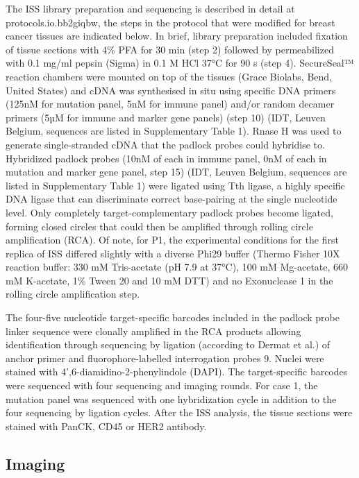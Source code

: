 The ISS library preparation and sequencing is described in detail at protocols.io.bb2giqbw, the steps in the protocol that were modified for breast cancer tissues are indicated below. In brief, library preparation included fixation of tissue sections with 4\% PFA for 30 min (step 2) followed by permeabilized with 0.1 mg/ml pepsin (Sigma) in 0.1 M HCl 37°C for 90 s (step 4). SecureSeal™ reaction chambers were mounted on top of the tissues (Grace Biolabs, Bend, United States) and cDNA was synthesised in situ using specific DNA primers (125nM for mutation panel, 5nM for immune panel) and/or random decamer primers (5µM for immune and marker gene panels) (step 10) (IDT, Leuven Belgium, sequences are listed in Supplementary Table 1). Rnase H was used to generate single-stranded cDNA that the padlock probes could hybridise to. Hybridized padlock probes (10nM of each in immune panel, 0nM of each in mutation and marker gene panel, step 15) (IDT, Leuven Belgium, sequences are listed in Supplementary Table 1) were ligated using Tth ligase, a highly specific DNA ligase that can discriminate correct base-pairing at the single nucleotide level. Only completely target-complementary padlock probes become ligated, forming closed circles that could then be amplified through rolling circle amplification (RCA). Of note, for P1, the experimental conditions for the first replica of ISS differed slightly with a diverse Phi29 buffer (Thermo Fisher 10X reaction buffer: 330 mM Tris-acetate (pH 7.9 at 37°C), 100 mM Mg-acetate, 660 mM K-acetate, 1\% Tween 20 and 10 mM DTT) and no Exonuclease 1 in the rolling circle amplification step.

The four-five nucleotide target-specific barcodes included in the padlock probe linker sequence were clonally amplified in the RCA products allowing identification through sequencing by ligation (according to Dermat et al.) of anchor primer and fluorophore-labelled interrogation probes 9. Nuclei were stained with 4',6-diamidino-2-phenylindole (DAPI). The target-specific barcodes were sequenced with four sequencing and imaging rounds. For case 1, the mutation panel was sequenced with one hybridization cycle in addition to the four sequencing by ligation cycles. After the \ac{ISS} analysis, the tissue sections were stained with PanCK, CD45 or HER2 antibody.

\subsection{Imaging}

